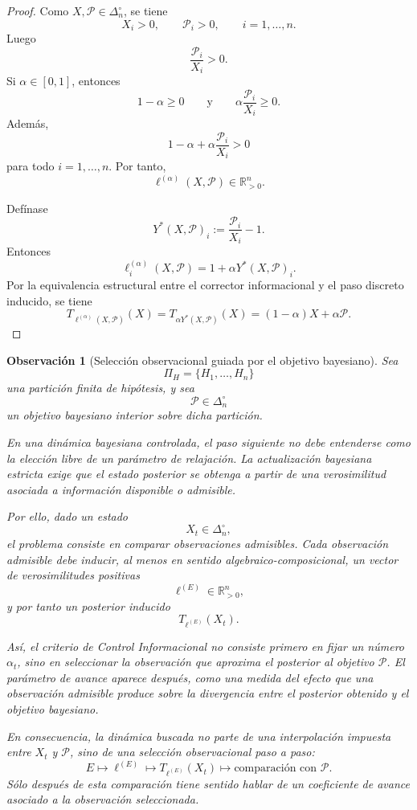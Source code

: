 \documentclass[12pt]{article}
\newtheorem{observacion}{Observación}[section]
\begin{document}
\begin{proof}
Como \(X,\mathcal P\in\Delta_n^\circ\), se tiene
\[
X_i>0,
\qquad
\mathcal P_i>0,
\qquad
i=1,\dots,n.
\]
Luego
\[
\frac{\mathcal P_i}{X_i}>0.
\]
Si \(\alpha\in[0,1]\), entonces
\[
1-\alpha\geq 0
\qquad
\text{y}
\qquad
\alpha\frac{\mathcal P_i}{X_i}\geq 0.
\]
Además,
\[
1-\alpha+\alpha\frac{\mathcal P_i}{X_i}>0
\]
para todo \(i=1,\dots,n\). Por tanto,
\[
\ell^{(\alpha)}(X,\mathcal P)\in\mathbb R_{>0}^n.
\]

Defínase
\[
Y^*(X,\mathcal P)_i
:=
\frac{\mathcal P_i}{X_i}-1.
\]
Entonces
\[
\ell^{(\alpha)}_i(X,\mathcal P)
=
1+\alpha Y^*(X,\mathcal P)_i.
\]
Por la equivalencia estructural entre el corrector informacional y el paso discreto inducido, se tiene
\[
T_{\ell^{(\alpha)}(X,\mathcal P)}(X)
=
T_{\alpha Y^*(X,\mathcal P)}(X)
=
(1-\alpha)X+\alpha \mathcal P.
\]
\end{proof}

\begin{observacion}[Selección observacional guiada por el objetivo bayesiano]
Sea
\[
\Pi_H=\{H_1,\dots,H_n\}
\]
una partición finita de hipótesis, y sea
\[
\mathcal P\in\Delta_n^\circ
\]
un objetivo bayesiano interior sobre dicha partición.

En una dinámica bayesiana controlada, el paso siguiente no debe entenderse como la elección libre de un parámetro de relajación. La actualización bayesiana estricta exige que el estado posterior se obtenga a partir de una verosimilitud asociada a información disponible o admisible.

Por ello, dado un estado
\[
X_t\in\Delta_n^\circ,
\]
el problema consiste en comparar observaciones admisibles. Cada observación admisible debe inducir, al menos en sentido algebraico-composicional, un vector de verosimilitudes positivas
\[
\ell^{(E)}\in\mathbb R_{>0}^n,
\]
y por tanto un posterior inducido
\[
T_{\ell^{(E)}}(X_t).
\]

Así, el criterio de Control Informacional no consiste primero en fijar un número \(\alpha_t\), sino en seleccionar la observación que aproxima el posterior al objetivo \(\mathcal P\). El parámetro de avance aparece después, como una medida del efecto que una observación admisible produce sobre la divergencia entre el posterior obtenido y el objetivo bayesiano.

En consecuencia, la dinámica buscada no parte de una interpolación impuesta entre \(X_t\) y \(\mathcal P\), sino de una selección observacional paso a paso:
\[
E
\longmapsto
\ell^{(E)}
\longmapsto
T_{\ell^{(E)}}(X_t)
\longmapsto
\text{comparación con }\mathcal P.
\]
Sólo después de esta comparación tiene sentido hablar de un coeficiente de avance asociado a la observación seleccionada.
\end{observacion}
\end{document}
